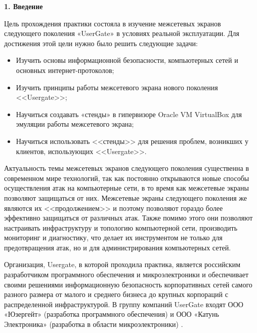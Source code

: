 \newcommand{\definition}[1]{\textbf{#1}}

\newcommand{\CLIA}{\textbf{CLI-A}}
\newcommand{\CLIB}{\textbf{CLI-B}}
\newcommand{\CLIEXT}{\textbf{CLI-EXT}}
\newcommand{\DC}{\textbf{DC}}
\newcommand{\UTM}{\textbf{UTM}}
\newcommand{\ISP}{\textbf{ISP}}

\begin{center}
	\textbf{\Large 1. Введение}
\end{center}

Цель прохождения практики состояла в изучение межсетевых экранов следующего поколения «UserGate» в условиях реальной эксплуатации. Для достижения этой цели нужно было решить следующие задачи:
		
\begin{itemize}[nosep]
	\item Изучить основы информационной безопасности, компьютерных сетей и основных интернет-протоколов;
			
	\item Изучить принципы работы межсетевого экрана нового поколения <<Usergate>>;
			
	\item Научиться создавать «стенды» в гипервизоре Oracle VM VirtualBox для эмуляции работы межсетевого экрана;
			
	\item Научиться использовать <<стенды>> для решения проблем, возникших у клиентов, использующих <<Usergate>>.
\end{itemize}
		
Актуальность темы межсетевых экранов следующего поколения существенна в современном мире технологий, так как постоянно открываются новые способы осуществления атак на компьютерные сети, в то время как межсетевые экраны позволяют защищаться от них. Межсетевые экраны следующего поколения же являются их <<продолжением>> и поэтому позволяют гораздо более эффективно защищаться от различных атак. Также помимо этого они позволяют настраивать инфраструктуру и топологию компьютерной сети, производить мониторинг и диагностику, что делает их инструментом не только для предотвращения атак, но и для администрирования компьютерных сетей.
		
Организация, Usergate, в которой проходила практика, является российским разработчиком программного обеспечения и микроэлектроники и обеспечивает своими решениями информационную безопасность корпоративных сетей самого разного размера от малого и среднего бизнеса до крупных корпораций с распределенной инфраструктурой. В группу компаний UserGate входят ООО «Юзергейт» (разработка программного обеспечения) и ООО «Катунь Электроника» (разработка в области микроэлектроники) \cite{usergate}.		
		
